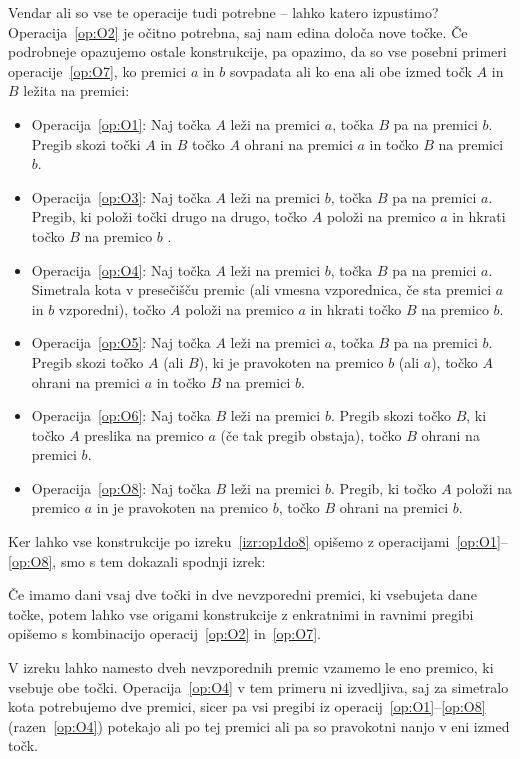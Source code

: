 Vendar ali so vse te operacije tudi potrebne -- lahko katero izpustimo? Operacija~\ref{op:O2} je očitno potrebna, saj nam edina določa nove točke. Če podrobneje opazujemo ostale konstrukcije, pa opazimo, da so vse posebni primeri operacije~\ref{op:O7}, ko premici $a$ in $b$ sovpadata ali ko ena ali obe izmed točk $A$ in $B$ ležita na premici:
\begin{itemize}
    \item Operacija~\ref{op:O1}: Naj točka $A$ leži na premici $a$, točka $B$ pa na premici $b$. Pregib skozi točki $A$ in $B$ točko $A$ ohrani na premici $a$ in točko $B$ na premici $b$.
    \item Operacija~\ref{op:O3}: Naj točka $A$ leži na premici $b$, točka $B$ pa na premici $a$. Pregib, ki položi točki drugo na drugo, točko $A$ položi na premico $a$ in hkrati točko $B$ na premico $b$ .
    \item Operacija~\ref{op:O4}: Naj točka $A$ leži na premici $b$, točka $B$ pa na premici $a$. Simetrala kota v presečišču premic (ali vmesna vzporednica, če sta premici $a$ in $b$ vzporedni), točko $A$ položi na premico $a$ in hkrati točko $B$ na premico $b$.
    \item Operacija~\ref{op:O5}: Naj točka $A$ leži na premici $a$, točka $B$ pa na premici $b$. Pregib skozi točko $A$ (ali $B$), ki je pravokoten na premico $b$ (ali $a$), točko $A$ ohrani na premici $a$ in točko $B$ na premici $b$.
    \item Operacija~\ref{op:O6}: Naj točka $B$ leži na premici $b$. Pregib skozi točko $B$, ki točko $A$ preslika na premico $a$ (če tak pregib obstaja), točko $B$ ohrani na premici $b$.
    \item Operacija~\ref{op:O8}: Naj točka $B$ leži na premici $b$. Pregib, ki točko $A$ položi na premico $a$ in je pravokoten na premico $b$, točko $B$ ohrani na premici $b$.
\end{itemize}

Ker lahko vse konstrukcije po izreku~\ref{izr:op1do8} opišemo z operacijami~\ref{op:O1}--\ref{op:O8}, smo s tem dokazali spodnji izrek:

\begin{izrek}
    \label{izr:dve_operaciji}
    Če imamo dani vsaj dve točki in dve nevzporedni premici, ki vsebujeta dane točke, potem lahko vse origami konstrukcije z enkratnimi in ravnimi pregibi opišemo s kombinacijo operacij~\ref{op:O2} in~\ref{op:O7}.
\end{izrek}
\begin{opomba}
    V izreku lahko namesto dveh nevzporednih premic vzamemo le eno premico, ki vsebuje obe točki. Operacija~\ref{op:O4} v tem primeru ni izvedljiva, saj za simetralo kota potrebujemo dve premici, sicer pa vsi pregibi iz operacij~\ref{op:O1}--\ref{op:O8} (razen~\ref{op:O4}) potekajo ali po tej premici ali pa so pravokotni nanjo v eni izmed točk. 
\end{opomba}

